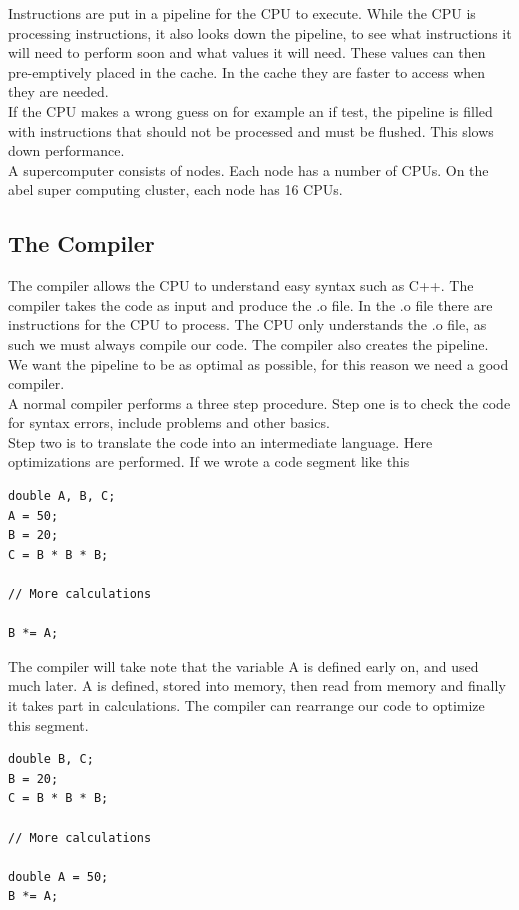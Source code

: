 \documentclass[a4paper,norsk,11pt,twoside]{report}
\begin{document}
Instructions are put in a pipeline for the CPU to execute. While the CPU is processing instructions, it also looks down the pipeline, to see what instructions it will need to perform soon and what values it will need. These values can then pre-emptively placed in the cache. In the cache they are faster to access when they are needed. \\

If the CPU makes a wrong guess on for example an if test, the pipeline is filled with instructions that should not be processed and must be flushed. This slows down performance. \\

A supercomputer consists of nodes. Each node has a number of CPUs. On the abel super computing cluster, each node has 16 CPUs. 

\subsection{The Compiler}
The compiler allows the CPU to understand easy syntax such as C++. The compiler takes the code as input and produce the .o file. In the .o file there are instructions for the CPU to process. The CPU only understands the .o file, as such we must always compile our code. The compiler also creates the pipeline. We want the pipeline to be as optimal as possible, for this reason we need a good compiler. \\

A normal compiler performs a three step procedure. Step one is to check the code for syntax errors, include problems and other basics. \\

Step two is to translate the code into an intermediate language. Here optimizations are performed. If we wrote a code segment like this

\begin{lstlisting}
double A, B, C;
A = 50;
B = 20;
C = B * B * B;

// More calculations

B *= A;
\end{lstlisting}

The compiler will take note that the variable A is defined early on, and used much later. A is defined, stored into memory, then read from memory and finally it takes part in calculations. The compiler can rearrange our code to optimize this segment. 

\begin{lstlisting}
double B, C;
B = 20;
C = B * B * B;

// More calculations

double A = 50;
B *= A;
\end{lstlisting}
\end{document}
